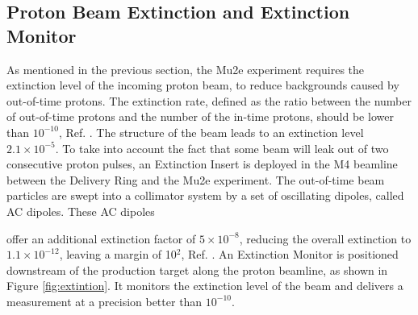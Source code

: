 \subsection{Proton Beam Extinction and Extinction Monitor}
As mentioned in the previous section, the Mu2e experiment 
requires the extinction level of the incoming proton beam, to reduce backgrounds caused by out-of-time protons. 
The extinction rate, defined as the ratio between the 
number of out-of-time protons and the number of the in-time protons, should be lower than $10^{-10}$, 
Ref. \cite{bartoszek2015mu2e}. The structure of the beam 
leads to an extinction level $2.1 \times 10^{-5}$. To take into account the fact that some beam will 
leak out of two consecutive proton pulses, an Extinction 
Insert is deployed in the M4 beamline between the Delivery Ring and the Mu2e experiment.
{\red The out-of-time 
beam particles are swept into a collimator system by a 
set of oscillating dipoles, called AC dipoles. These AC dipoles}

offer an additional 
extinction factor of $5\times 10^{-8}$, reducing the 
overall extinction to $1.1 \times 10^{-12}$, leaving a margin of 10$^2$, Ref. \cite{accelerator}. An 
Extinction Monitor is positioned downstream of the 
production target along the proton beamline, as shown in Figure \ref{fig:extintion}. It monitors the 
extinction level of the  beam  {\red and delivers a measurement at a precision better than $10^{-10}$.}


